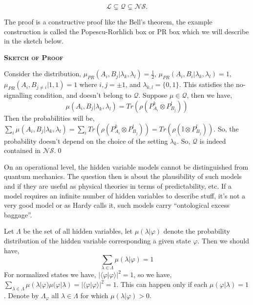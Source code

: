 \documentclass[11pt]{report}
\begin{document}
\vspace{1em}
\begin{theorem}
	$$\mathcal{L} \subsetneq \mathcal{Q}\subsetneq \mathcal{NS}.$$
\end{theorem}
\vspace{1em}
The proof is a constructive proof like the Bell's theorem, the example construction is called the Popescu-Rorhlich box or PR box which we will describe in the sketch below.
\begin{center}
	{\bfseries\textsc{Sketch of Proof}}
\end{center}
\begin{adjustwidth}{1em}{1em}
	Consider the distribution,
	$\mu_{PR}(A_i, B_j|\lambda_k,\lambda_l)=\textstyle\frac{1}{2}$, $\mu_{PR}(A_i,B_i|\lambda_k,\lambda_l)=1$, $\mu_{PR}(A_i,B_{j\neq i}|1,1)=1$ where $i,j=\pm 1$, and $\lambda_{k,l}=\{0,1\}$. This satisfies the no-signalling condition, and doesn't belong to $\mathcal{Q}$. Suppose $\mu\in \mathcal{Q}$, then we have,
	$$\mu(A_i,B_j|\lambda_k,\lambda_l)=Tr(\rho (P_{A_i}^k\otimes P_{B_j}^l))$$
	Then the probabilities will be,
	$\textstyle\sum_{i}\mu_{}(A_i, B_j|\lambda_k,\lambda_l)=\sum_i Tr(\rho (P_{A_i}^k\otimes P_{B_j}^l))=Tr(\rho (\mathbb{I}\otimes P_{B_j}^l))$. So, the probability doesn't depend on the choice of the setting $\lambda_k$. So, $\mathcal{Q}$ is indeed contained in $\mathcal{NS}$.\qed
\end{adjustwidth}
\vspace{1em}


On an operational level, the hidden variable models cannot be distinguished from quantum mechanics. The question then is about the plausibility of such models and if they are useful as physical theories in terms of predictability, etc. If a model requires an infinite number of hidden variables to describe stuff, it's not a very good model or as Hardy calls it, such models carry ``ontological excess baggage''.

Let $\Lambda$ be the set of all hidden variables, let $\mu(\lambda|\varphi)$ denote the probability distribution of the hidden variable corresponding a given state $\varphi$. Then we should have,
$$\sum_{\lambda\in \Lambda}\mu(\lambda|\varphi)=1$$
For normalized states we have, $|\langle \varphi|\varphi\rangle|^2=1$, so we have, $\sum_{\lambda\in \Lambda}\mu(\lambda|\varphi)\mu(\varphi|\lambda)=|\langle \varphi|\varphi\rangle|^2=1$. This can happen only if each $\mu(\varphi|\lambda)=1$. Denote by $\Lambda_\varphi$ all $\lambda\in \Lambda$ for which $\mu(\lambda|\varphi)>0$.
\end{document}
